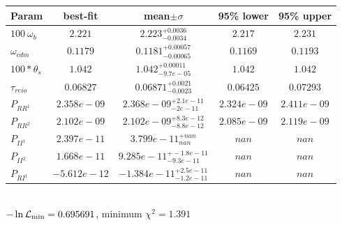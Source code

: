 \begin{tabular}{|l|c|c|c|c|} 
 \hline 
Param & best-fit & mean$\pm\sigma$ & 95\% lower & 95\% upper \\ \hline 
$100~\omega_{b }$ &$2.221$ & $2.223_{-0.0034}^{+0.0036}$ & $2.217$ & $2.231$ \\ 
$\omega_{cdm }$ &$0.1179$ & $0.1181_{-0.00065}^{+0.00057}$ & $0.1169$ & $0.1193$ \\ 
$100*\theta_{s }$ &$1.042$ & $1.042_{-9.7e-05}^{+0.00011}$ & $1.042$ & $1.042$ \\ 
$\tau_{reio }$ &$0.06827$ & $0.06871_{-0.0023}^{+0.0021}$ & $0.06425$ & $0.07293$ \\ 
$P_{{RR}^1 }$ &$2.358e-09$ & $2.368e-09_{-2e-11}^{+2.1e-11}$ & $2.324e-09$ & $2.411e-09$ \\ 
$P_{{RR}^2 }$ &$2.102e-09$ & $2.102e-09_{-8.8e-12}^{+8.3e-12}$ & $2.085e-09$ & $2.119e-09$ \\ 
$P_{{II}^1 }$ &$2.397e-11$ & $3.799e-11_{nan}^{+nan}$ & $nan$ & $nan$ \\ 
$P_{{II}^2 }$ &$1.668e-11$ & $9.285e-11_{-9.3e-11}^{+-1.8e-11}$ & $nan$ & $nan$ \\ 
$P_{{RI}^1 }$ &$-5.612e-12$ & $-1.384e-11_{-1.2e-11}^{+2.5e-11}$ & $nan$ & $nan$ \\ 
\hline 
 \end{tabular} \\ 
$-\ln{\cal L}_\mathrm{min} =0.695691$, minimum $\chi^2=1.391$ \\ 
